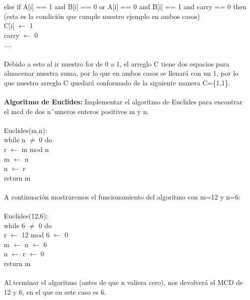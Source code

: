 \documentclass[12pt,twoside]{article}
\begin{document}
\hspace*{2cm}else if A[i] == 1 and B[i] == 0  or A[i] == 0 and B[i] == 1 and carry ==  0 then (esta es la condici\'on que cumple nuestro ejemplo en ambos casos)\\ 
\hspace*{3cm}C[i] $\leftarrow$ 1\\
\hspace*{3cm}carry $\leftarrow$ 0\\
\hspace*{2cm}....\\\\
Debido a esto al ir nuestro for de 0 a 1, el arreglo C tiene dos espacios para almacenar nuestra suma, por lo que en ambos casos se llenar\'a con un 1, por lo que nuestro arreglo C quedar\'a conformado de la siguiente manera C=\{1,1\}.\\\\
{\bf Algoritmo de Euclides:} Implementar el algoritmo de Euclides para encontrar el mcd de dos n´umeros enteros
positivos m y n.\\\\
\hspace*{1cm}Euclides(m,n):\\
\hspace*{2cm}while n $\neq$ 0 do\\
\hspace*{3cm}r $\leftarrow$ m mod n\\
\hspace*{3cm}m $\leftarrow$ n \\
\hspace*{3cm}n $\leftarrow$ r \\
\hspace*{2cm}return m\\\\
A continuaci\'on mostraremos el funcionamiento del algoritmo con m=12 y n=6:\\\\
\hspace*{1cm}Euclides(12,6):\\
\hspace*{2cm}while 6 $\neq$ 0 do\\
\hspace*{3cm}r $\leftarrow$ 12 mod 6 $\leftarrow$ 0\\
\hspace*{3cm}m $\leftarrow$ n $\leftarrow$ 6\\
\hspace*{3cm}n $\leftarrow$ r $\leftarrow$ 0\\
\hspace*{2cm}return m\\\\
Al terminar el algoritmo (antes de que n valiera cero), nos devolver\'a el MCD de 12 y 6, en el que en este caso es 6.\\\\\
\end{document}
